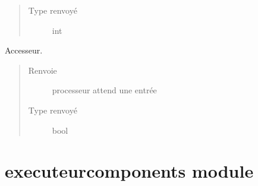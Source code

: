 \documentclass[letterpaper,10pt,french]{sphinxmanual}
\begin{document}
\begin{fulllineitems}
\begin{fulllineitems}
\begin{quote}
\begin{description}
\item[{Type renvoyé}] \leavevmode
int

\end{description}\end{quote}

\end{fulllineitems}


\begin{fulllineitems}
\label{\detokenize{executeur:executeur.Executeur.waitingInput}}
Accesseur.
\begin{quote}\begin{description}
\item[{Renvoie}] \leavevmode
processeur attend une entrée

\item[{Type renvoyé}] \leavevmode
bool

\end{description}\end{quote}

\end{fulllineitems}


\end{fulllineitems}



\section{executeurcomponents module}
\label{\detokenize{executeurcomponents:module-executeurcomponents}}\label{\detokenize{executeurcomponents:executeurcomponents-module}}\label{\detokenize{executeurcomponents::doc}}\label{\detokenize{executeurcomponents:module-executeurcomponents}}
\end{document}

